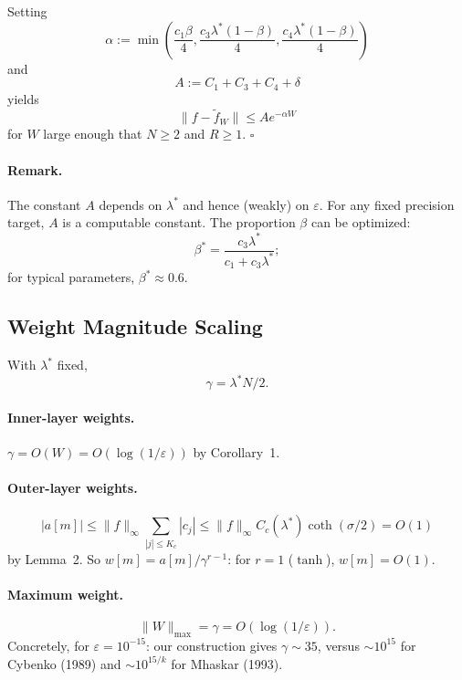 \documentclass{article}
\begin{document}
Setting
\[
\alpha := \min\!\left(
\frac{c_1\beta}{4},
\frac{c_3\lambda^*(1-\beta)}{4},
\frac{c_4\lambda^*(1-\beta)}{4}
\right)
\]
and
\[
A := C_1 + C_3 + C_4 + \delta
\]
yields
\[
\|f - \widetilde{f}_W\| \leq A e^{-\alpha W}
\]
for \(W\) large enough that \(N \ge 2\) and \(R \ge 1\). \hfill\(\square\)

\paragraph{Remark.}
The constant \(A\) depends on \(\lambda^*\) and hence (weakly) on \(\varepsilon\). For any fixed precision target, \(A\) is a computable constant. The proportion \(\beta\) can be optimized:
\[
\beta^* = \frac{c_3\lambda^*}{c_1 + c_3\lambda^*};
\]
for typical parameters, \(\beta^* \approx 0.6\).

\subsection{Weight Magnitude Scaling}
\label{app:weight-scaling}

With \(\lambda^*\) fixed,
\[
\gamma = \lambda^* N/2.
\]

\paragraph{Inner-layer weights.}
\(\gamma = O(W) = O(\log(1/\varepsilon))\) by Corollary~1.

\paragraph{Outer-layer weights.}
\[
|a[m]|
\le
\|f\|_\infty \sum_{|j| \le K_c} |c_j|
\le
\|f\|_\infty C_c(\lambda^*) \coth(\sigma/2)
=
O(1)
\]
by Lemma~2. So \(w[m] = a[m]/\gamma^{r-1}\): for \(r = 1\) (\(\tanh\)), \(w[m] = O(1)\).

\paragraph{Maximum weight.}
\[
\|W\|_{\max} = \gamma = O(\log(1/\varepsilon)).
\]
Concretely, for \(\varepsilon = 10^{-15}\): our construction gives \(\gamma \sim 35\), versus \(\sim 10^{15}\) for Cybenko (1989) and \(\sim 10^{15/k}\) for Mhaskar (1993).
\end{document}
